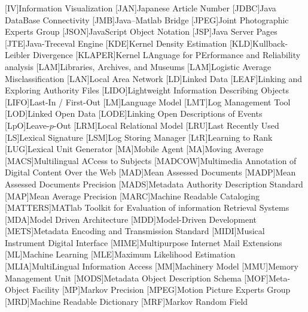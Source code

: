 [IV]{Information Visualization}
[JAN]{Japanese Article Number}
[JDBC]{Java DataBase Connectivity}
[JMB]{Java--Matlab Bridge}
[JPEG]{Joint Photographic Experts Group}
[JSON]{JavaScript Object Notation}
[JSP]{Java Server Pages}
[JTE]{Java-Treceval Engine}
[KDE]{Kernel Density Estimation}
[KLD]{Kullback-Leibler Divergence}
[KLAPER]{Kernel LAnguage for PErformance and Reliability analysis}
[LAM]{Libraries, Archives, and Museums}
[LAM]{Logistic Average Misclassification}
[LAN]{Local Area Network}
[LD]{Linked Data}
[LEAF]{Linking and Exploring Authority Files}
[LIDO]{Lightweight Information Describing Objects}
[LIFO]{Last-In / First-Out}
[LM]{Language Model}
[LMT]{Log Management Tool}
[LOD]{Linked Open Data}
[LODE]{Linking Open Descriptions of Events}
[LpO]{Leave-$p$-Out}
[LRM]{Local Relational Model}
[LRU]{Last Recently Used}
[LS]{Lexical Signature}
[LSM]{Log Storing Manager}
[LtR]{Learning to Rank}
[LUG]{Lexical Unit Generator}
[MA]{Mobile Agent}
[MA]{Moving Average}
[MACS]{Multilingual ACcess to Subjects}
[MADCOW]{Multimedia Annotation of Digital Content Over the Web}
[MAD]{Mean Assessed Documents}
[MADP]{Mean Assessed Documents Precision}
[MADS]{Metadata Authority Description Standard}
[MAP]{Mean Average Precision}
[MARC]{Machine Readable Cataloging}
[MATTERS]{MATlab Toolkit for Evaluation of information Retrieval Systems}
[MDA]{Model Driven Architecture}
[MDD]{Model-Driven Development}
[METS]{Metadata Encoding and Transmission Standard}
[MIDI]{Musical Instrument Digital Interface}
[MIME]{Multipurpose Internet Mail Extensions}
[ML]{Machine Learning}
[MLE]{Maximum Likelihood Estimation}
[MLIA]{MultiLingual Information Access}
[MM]{Machinery Model}
[MMU]{Memory Management Unit}
[MODS]{Metadata Object Description Schema}
[MOF]{Meta-Object Facility}
[MP]{Markov Precision}
[MPEG]{Motion Picture Experts Group}
[MRD]{Machine Readable Dictionary}
[MRF]{Markov Random Field}
